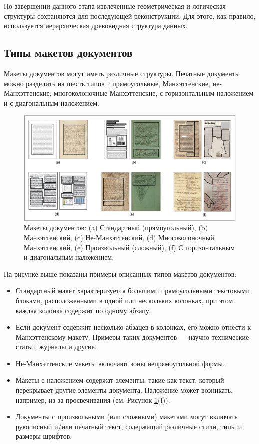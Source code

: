 По завершении данного этапа извлеченные геометрическая и логическая структуры сохраняются для последующей реконструкции.
Для этого, как правило, используется иерархическая древовидная структура данных.~\cite{dla-book}

\subsection{Типы макетов документов}


Макеты документов могут иметь различные структуры.
Печатные документы можно разделить на шесть типов~\cite{kise}: прямоугольные, Манхэттенские, не-Манхэттенские, многоколоночные Манхэттенские, с горизонтальным наложением и с диагональным наложением.

\begin{figure}[H]
	\centering
    \includegraphics[width=\textwidth]{img/layouts.png}
    \caption{Макеты документов: (a) Стандартный (прямоугольный), (b) Манхэттенский, (c) Не-Манхэттенский, (d) Многоколоночный Манхэттенский, (e) Произвольный (сложный), (f) С горизонтальным и диагональным наложением.~\cite{dla-survey}}
	\label{fig:layouts}
\end{figure}

На рисунке выше показаны примеры описанных типов макетов документов:
\begin{itemize}
    \item Стандартный макет характеризуется большими прямоугольными текстовыми блоками, расположенными в одной или нескольких колонках, при этом каждая колонка содержит по одному абзацу.
    \item Если документ содержит несколько абзацев в колонках, его можно отнести к Манхэттенскому макету.
Примеры таких документов --- научно-технические статьи, журналы и другие.
    \item Не-Манхэттенские макеты включают зоны непрямоугольной формы.
    \item Макеты с наложением содержат элементы, такие как текст, который перекрывает другие элементы документа.
Наложение может возникать, например, из-за просвечивания (см. Рисунок \ref{fig:layouts}(f)).
    \item Документы с произвольными (или сложными) макетами могут включать рукописный и/или печатный текст, содержащий различные стили, типы и размеры шрифтов.
\end{itemize}

